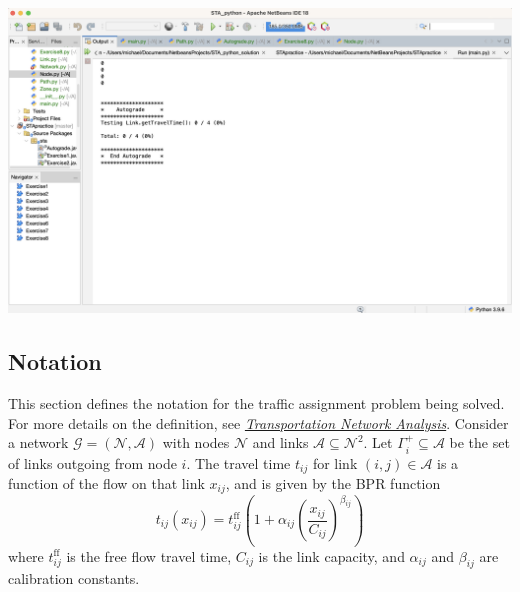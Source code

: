 \documentclass[11pt]{article}
\newcommand{\N}{\mathcal{N}}
\newcommand{\A}{\mathcal{A}}
\newcommand{\tff}{t^{\mathrm{ff}}_{ij}}
\begin{document}
\begin{center}
	\includegraphics[width=\textwidth]{netbeans1a.png}
\end{center}








\subsection{Notation}

This section defines the notation for the traffic assignment problem being solved. 
For more details on the definition, see \href{https://sboyles.github.io/blubook.html}{\textit{Transportation Network Analysis}}. 
Consider a network $\mathcal{G}=(\N,\A)$ with nodes $\N$ and links $\A\subseteq \N^2$.  Let $\Gamma^+_i\subseteq\A$ be the set of links outgoing from node $i$. The travel time $t_{ij}$ for link $(i,j)\in\A$ is a function of the flow on that link $x_{ij}$, and is given by the BPR function
\begin{equation}
	t_{ij}(x_{ij}) = \tff \left(1+\alpha_{ij} \left(\frac{x_{ij}}{C_{ij}}\right)^{\beta_{ij}}\right) \label{bpr}
\end{equation}
where $\tff$ is the free flow travel time, $C_{ij}$ is the link capacity, and $\alpha_{ij}$ and $\beta_{ij}$ are calibration constants.
\end{document}
